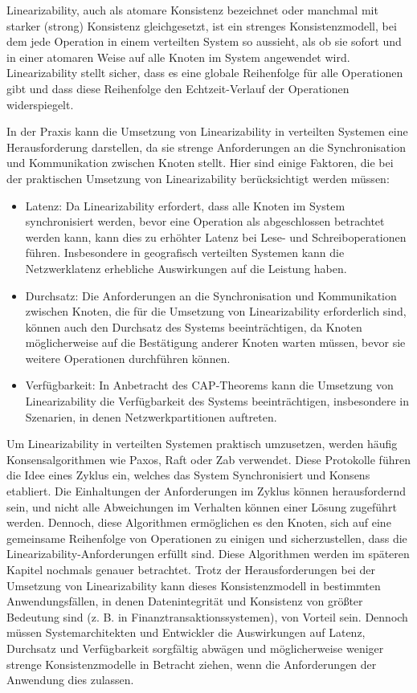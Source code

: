 \documentclass[../vs-script-first-v01.tex]{subfiles}
\begin{document}
Linearizability, auch als atomare Konsistenz bezeichnet oder manchmal mit starker (strong) Konsistenz gleichgesetzt, ist ein strenges Konsistenzmodell, bei dem jede Operation in einem verteilten System so aussieht, als ob sie sofort und in einer atomaren Weise auf alle Knoten im System angewendet wird. Linearizability stellt sicher, dass es eine globale Reihenfolge für alle Operationen gibt und dass diese Reihenfolge den Echtzeit-Verlauf der Operationen widerspiegelt.

In der Praxis kann die Umsetzung von Linearizability in verteilten Systemen eine Herausforderung darstellen, da sie strenge Anforderungen an die Synchronisation und Kommunikation zwischen Knoten stellt. Hier sind einige Faktoren, die bei der praktischen Umsetzung von Linearizability berücksichtigt werden müssen:

\begin{itemize}
\item Latenz: Da Linearizability erfordert, dass alle Knoten im System synchronisiert werden, bevor eine Operation als abgeschlossen betrachtet werden kann, kann dies zu erhöhter Latenz bei Lese- und Schreiboperationen führen. Insbesondere in geografisch verteilten Systemen kann die Netzwerklatenz erhebliche Auswirkungen auf die Leistung haben.
\item Durchsatz: Die Anforderungen an die Synchronisation und Kommunikation zwischen Knoten, die für die Umsetzung von Linearizability erforderlich sind, können auch den Durchsatz des Systems beeinträchtigen, da Knoten möglicherweise auf die Bestätigung anderer Knoten warten müssen, bevor sie weitere Operationen durchführen können.
\item Verfügbarkeit: In Anbetracht des CAP-Theorems kann die Umsetzung von Linearizability die Verfügbarkeit des Systems beeinträchtigen, insbesondere in Szenarien, in denen Netzwerkpartitionen auftreten.
\end{itemize}
Um Linearizability in verteilten Systemen praktisch umzusetzen, werden häufig Konsensalgorithmen wie Paxos, Raft oder Zab verwendet. Diese Protokolle führen die Idee eines Zyklus ein, welches das System Synchronisiert und Konsens etabliert. Die Einhaltungen der Anforderungen im Zyklus können herausfordernd sein, und nicht alle Abweichungen im Verhalten können einer Lösung zugeführt werden. Dennoch, diese Algorithmen ermöglichen es den Knoten, sich auf eine gemeinsame Reihenfolge von Operationen zu einigen und sicherzustellen, dass die Linearizability-Anforderungen erfüllt sind. Diese Algorithmen werden im späteren Kapitel nochmals genauer betrachtet. Trotz der Herausforderungen bei der Umsetzung von Linearizability kann dieses Konsistenzmodell in bestimmten Anwendungsfällen, in denen Datenintegrität und Konsistenz von größter Bedeutung sind (z. B. in Finanztransaktionssystemen), von Vorteil sein. Dennoch müssen Systemarchitekten und Entwickler die Auswirkungen auf Latenz, Durchsatz und Verfügbarkeit sorgfältig abwägen und möglicherweise weniger strenge Konsistenzmodelle in Betracht ziehen, wenn die Anforderungen der Anwendung dies zulassen.
\end{document}
